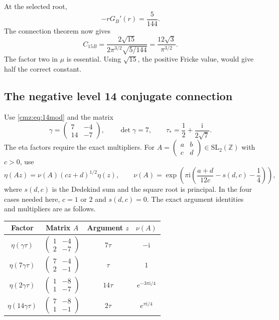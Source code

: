 \documentclass[11pt,letterpaper]{article}
\numberwithin{equation}{section}
\theoremstyle{definition}\newtheorem{definition}[theorem]{Definition}
\theoremstyle{remark}\newtheorem{remark}[theorem]{Remark}
\newcommand{\ii}{\mathrm i}
\newcommand{\Z}{\mathbb Z}
\begin{document}
At the selected root,
\[
-rG_B'(r)=\frac5{144}.
\]
The connection theorem now gives
\begin{equation}
C_{15B}=\frac{2\sqrt{15}}{2\pi^{3/2}\sqrt{5/144}}
       =\frac{12\sqrt3}{\pi^{3/2}}.
\label{cmz:eq:C15B}
\end{equation}
The factor two in $\mu$ is essential. Using $\sqrt{15}$, the positive Fricke value, would give half the correct constant.

\subsection{The negative level 14 conjugate connection}
Use \eqref{cmz:eq:14mod} and the matrix
\begin{equation}
\gamma=\begin{pmatrix}7&-4\\14&-7\end{pmatrix},\qquad
\det\gamma=7,\qquad \tau_*=\frac12+\frac{\ii}{2\sqrt7}.
\label{cmz:eq:gamma14}
\end{equation}
The eta factors require the exact multipliers. For $A=\left(\begin{smallmatrix}a&b\\c&d\end{smallmatrix}\right)\in\mathrm{SL}_2(\Z)$ with $c>0$, use
\begin{equation}
\eta(Az)=\nu(A)(cz+d)^{1/2}\eta(z),\qquad
\nu(A)=\exp\!\left(\pi\ii\left(\frac{a+d}{12c}-s(d,c)-\frac14\right)\right),
\label{cmz:eq:multiplier}
\end{equation}
where $s(d,c)$ is the Dedekind sum and the square root is principal. In the four cases needed here, $c=1$ or $2$ and $s(d,c)=0$. The exact argument identities and multipliers are as follows.
\begin{center}
\renewcommand{\arraystretch}{1.45}
\begin{tabular}{cccc}
\toprule
Factor & Matrix $A$ & Argument $z$ & $\nu(A)$\\
\midrule
$\eta(\gamma\tau)$ & $\left(\begin{smallmatrix}1&-4\\2&-7\end{smallmatrix}\right)$ & $7\tau$ & $-\ii$\\
$\eta(7\gamma\tau)$ & $\left(\begin{smallmatrix}7&-4\\2&-1\end{smallmatrix}\right)$ & $\tau$ & $1$\\
$\eta(2\gamma\tau)$ & $\left(\begin{smallmatrix}1&-8\\1&-7\end{smallmatrix}\right)$ & $14\tau$ & $e^{-3\pi\ii/4}$\\
$\eta(14\gamma\tau)$ & $\left(\begin{smallmatrix}7&-8\\1&-1\end{smallmatrix}\right)$ & $2\tau$ & $e^{\pi\ii/4}$\\
\bottomrule
\end{tabular}
\end{center}
\end{document}
